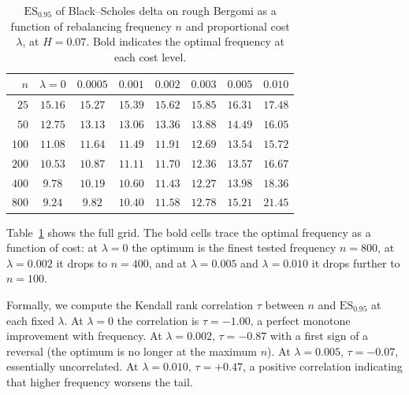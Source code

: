 \documentclass[12pt,a4paper]{article}
\theoremstyle{definition}
\theoremstyle{plain}
\theoremstyle{remark}
\theoremstyle{plain}
\begin{document}
\begin{table}[htbp]
\centering
\caption{$\mathrm{ES}_{0.95}$ of Black--Scholes delta on rough
Bergomi as a function of rebalancing frequency $n$ and
proportional cost $\lambda$, at $H = 0.07$. Bold indicates the
optimal frequency at each cost level.}
\label{tab:6_3_h2}
\small
\begin{tabular}{rccccccc}
\toprule
$n$ & $\lambda = 0$    & $0.0005$         & $0.001$          & $0.002$          & $0.003$          & $0.005$          & $0.010$ \\
\midrule
$25$  & $15.16$          & $15.27$          & $15.39$          & $15.62$          & $15.85$          & $16.31$          & $17.48$ \\
$50$  & $12.75$          & $13.13$          & $13.06$          & $13.36$          & $13.88$          & $14.49$          & $16.05$ \\
$100$ & $11.08$          & $11.64$          & $11.49$          & $11.91$          & $12.69$          & $\mathbf{13.54}$ & $\mathbf{15.72}$ \\
$200$ & $10.53$          & $10.87$          & $11.11$          & $11.70$          & $12.36$          & $13.57$          & $16.67$ \\
$400$ & $9.78$           & $10.19$          & $10.60$          & $\mathbf{11.43}$ & $\mathbf{12.27}$ & $13.98$          & $18.36$ \\
$800$ & $\mathbf{9.24}$  & $\mathbf{9.82}$  & $\mathbf{10.40}$ & $11.58$          & $12.78$          & $15.21$          & $21.45$ \\
\bottomrule
\end{tabular}
\end{table}

Table~\ref{tab:6_3_h2} shows the full grid. The bold cells trace
the optimal frequency as a function of cost: at $\lambda = 0$
the optimum is the finest tested frequency $n = 800$, at
$\lambda = 0.002$ it drops to $n = 400$, and at $\lambda = 0.005$
and $\lambda = 0.010$ it drops further to $n = 100$.

Formally, we compute the Kendall rank correlation $\tau$ between
$n$ and $\mathrm{ES}_{0.95}$ at each fixed $\lambda$. At
$\lambda = 0$ the correlation is $\tau = -1.00$, a perfect
monotone improvement with frequency. At $\lambda = 0.002$,
$\tau = -0.87$ with a first sign of a reversal (the optimum is
no longer at the maximum $n$). At $\lambda = 0.005$,
$\tau = -0.07$, essentially uncorrelated. At $\lambda = 0.010$,
$\tau = +0.47$, a positive correlation indicating that higher
frequency worsens the tail.
\end{document}
